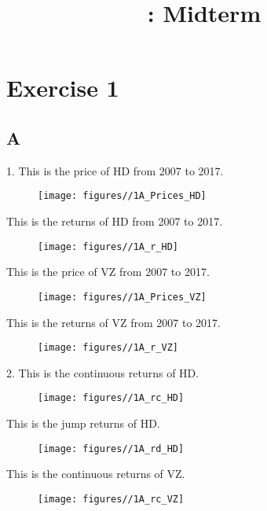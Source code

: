 \documentclass{report}
\title{\LectureTitle: Midterm}
\begin{document}
\maketitle
\newpage

\section{Exercise 1}

\subsection{A}

1. This is the price of HD from 2007 to 2017.
\begin{figure}[H]
        \centering 
         \texttt{[image: figures//1A\_Prices\_HD]}
\end{figure}

This is the returns of HD from 2007 to 2017.
\begin{figure}[H]
        \centering 
         \texttt{[image: figures//1A\_r\_HD]}
\end{figure}

This is the price of VZ from 2007 to 2017.
\begin{figure}[H]
        \centering 
         \texttt{[image: figures//1A\_Prices\_VZ]}
\end{figure}

This is the returns of VZ from 2007 to 2017.
\begin{figure}[H]
        \centering 
         \texttt{[image: figures//1A\_r\_VZ]}
\end{figure}

2. This is the continuous returns of HD.
\begin{figure}[H]
        \centering 
         \texttt{[image: figures//1A\_rc\_HD]}
\end{figure}

This is the jump returns of HD.
\begin{figure}[H]
        \centering 
         \texttt{[image: figures//1A\_rd\_HD]}
\end{figure}

This is the continuous returns of VZ.
\begin{figure}[H]
        \centering 
         \texttt{[image: figures//1A\_rc\_VZ]}
\end{figure}
\end{document}
